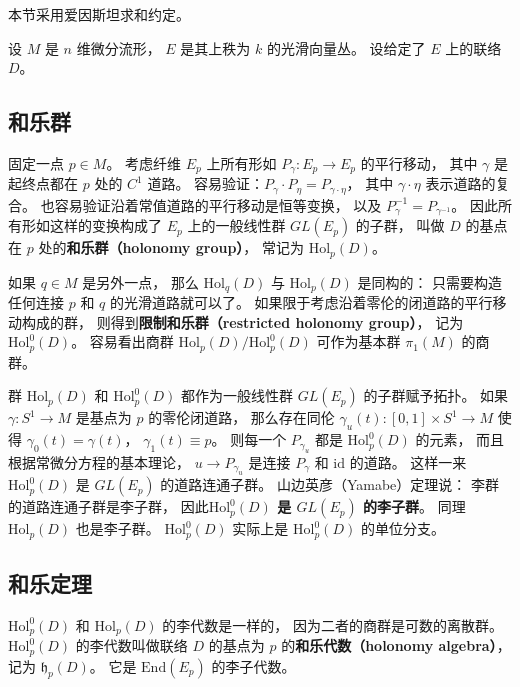 

本节采用爱因斯坦求和约定。

设 $M$ 是 $n$ 维微分流形， $E$ 是其上秩为 $k$ 的光滑向量丛。 设给定了 $E$ 上的联络 $D$。

\subsection{和乐群}
固定一点 $p\in M$。 考虑纤维 $E_p$ 上所有形如 $P_\gamma:E_p\to E_p$ 的平行移动， 其中 $\gamma$ 是起终点都在 $p$ 处的 $C^1$ 道路。 容易验证：$P_\gamma\cdot P_\eta=P_{\gamma\cdot\eta}$，
其中 $\gamma\cdot\eta$ 表示道路的复合。 也容易验证沿着常值道路的平行移动是恒等变换， 以及 $P_\gamma^{-1}=P_{\gamma^{-1}}$。 因此所有形如这样的变换构成了 $E_p$ 上的一般线性群 $GL(E_p)$ 的子群， 叫做 $D$ 的基点在 $p$ 处的\textbf{和乐群（holonomy group）}， 常记为 $\text{Hol}_p(D)$。 

如果 $q\in M$ 是另外一点， 那么 $\text{Hol}_q(D)$ 与 $\text{Hol}_p(D)$ 是同构的： 只需要构造任何连接 $p$ 和 $q$ 的光滑道路就可以了。 如果限于考虑沿着零伦的闭道路的平行移动构成的群， 则得到\textbf{限制和乐群（restricted holonomy group）}， 记为 $\text{Hol}^0_p(D)$。 容易看出商群 $\text{Hol}_p(D)/\text{Hol}_p^0(D)$ 可作为基本群 $\pi_1(M)$ 的商群。

群 $\text{Hol}_p(D)$ 和 $\text{Hol}_p^0(D)$ 都作为一般线性群 $GL(E_p)$ 的子群赋予拓扑。 如果 $\gamma:S^1\to M$ 是基点为 $p$ 的零伦闭道路， 那么存在同伦 $\gamma_u(t):[0,1]\times S^1\to M$ 使得 $\gamma_0(t)=\gamma(t)$， $\gamma_1(t)\equiv p$。 则每一个 $P_{\gamma_u}$ 都是 $\text{Hol}_p^0(D)$ 的元素， 而且根据常微分方程的基本理论， $u\to P_{\gamma_u}$ 是连接 $P_\gamma$ 和 $\text{id}$ 的道路。 这样一来 $\text{Hol}_p^0(D)$ 是 $GL(E_p)$ 的道路连通子群。 山边英彦（Yamabe）定理说： 李群的道路连通子群是李子群， 因此\textbf{$\text{Hol}_p^0(D)$ 是 $GL(E_p)$ 的李子群}。 同理 $\text{Hol}_p(D)$ 也是李子群。 $\text{Hol}_p^0(D)$ 实际上是 $\text{Hol}_p^0(D)$ 的单位分支。

\subsection{和乐定理}
$\text{Hol}_p^0(D)$ 和 $\text{Hol}_p(D)$ 的李代数是一样的， 因为二者的商群是可数的离散群。 $\text{Hol}_p^0(D)$ 的李代数叫做联络 $D$ 的基点为 $p$ 的\textbf{和乐代数（holonomy algebra）}， 记为 $\mathfrak{h}_p(D)$。  它是 $\text{End}(E_p)$ 的李子代数。 

